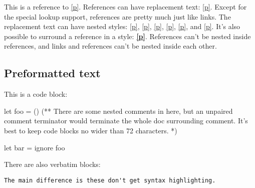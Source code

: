 This is a reference to \hyperref[package-test+u+package+++ml-module-Markup-val-foo]{[p\pageref*{package-test+u+package+++ml-module-Markup-val-foo}]}. References can have replacement text: \hyperref[package-test+u+package+++ml-module-Markup-val-foo]{[p\pageref*{package-test+u+package+++ml-module-Markup-val-foo}]}. Except for the special lookup support, references are pretty much just like links. The replacement text can have nested styles: \hyperref[package-test+u+package+++ml-module-Markup-val-foo]{[p\pageref*{package-test+u+package+++ml-module-Markup-val-foo}]}, \hyperref[package-test+u+package+++ml-module-Markup-val-foo]{[p\pageref*{package-test+u+package+++ml-module-Markup-val-foo}]}, \hyperref[package-test+u+package+++ml-module-Markup-val-foo]{[p\pageref*{package-test+u+package+++ml-module-Markup-val-foo}]}, \hyperref[package-test+u+package+++ml-module-Markup-val-foo]{[p\pageref*{package-test+u+package+++ml-module-Markup-val-foo}]}, \hyperref[package-test+u+package+++ml-module-Markup-val-foo]{[p\pageref*{package-test+u+package+++ml-module-Markup-val-foo}]}, and \hyperref[package-test+u+package+++ml-module-Markup-val-foo]{[p\pageref*{package-test+u+package+++ml-module-Markup-val-foo}]}. It's also possible to surround a reference in a style: \textbf{\hyperref[package-test+u+package+++ml-module-Markup-val-foo]{[p\pageref*{package-test+u+package+++ml-module-Markup-val-foo}]}}. References can't be nested inside references, and links and references can't be nested inside each other.

\subsection{Preformatted text\label{preformatted-text}}%
This is a code block:\medbreak
\begin{ocamlcodeblock}
let foo = ()
(** There are some nested comments in here, but an unpaired comment
    terminator would terminate the whole doc surrounding comment. It's
    best to keep code blocks no wider than 72 characters. *)

let bar =
  ignore foo
\end{ocamlcodeblock}\medbreak
There are also verbatim blocks:

\begin{verbatim}The main difference is these don't get syntax highlighting.\end{verbatim}%
